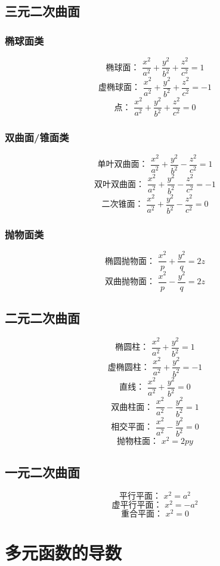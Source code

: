 \documentclass[12pt, a4paper, oneside]{ctexbook}
\begin{document}
  \subsection{三元二次曲面}
    \subsubsection{椭球面类}
    $$
    \text{椭球面： }\frac{x^2}{a^2}+\frac{y^2}{b^2}+\frac{z^2}{c^2}=1
    $$
    $$
    \text{虚椭球面： }\frac{x^2}{a^2}+\frac{y^2}{b^2}+\frac{z^2}{c^2}=-1
    $$
    $$
    \text{点： }\frac{x^2}{a^2}+\frac{y^2}{b^2}+\frac{z^2}{c^2}=0
    $$
    \subsubsection{双曲面/锥面类}
    $$
    \text{单叶双曲面： }\frac{x^2}{a^2}+\frac{y^2}{b^2}-\frac{z^2}{c^2}=1
    $$
    $$
    \text{双叶双曲面： }\frac{x^2}{a^2}+\frac{y^2}{b^2}-\frac{z^2}{c^2}=-1
    $$
    $$
    \text{二次锥面： }\frac{x^2}{a^2}+\frac{y^2}{b^2}-\frac{z^2}{c^2}=0
    $$
    \subsubsection{抛物面类}
    $$
    \text{椭圆抛物面： }\frac{x^2}{p}+\frac{y^2}{q}=2z
    $$
    $$
    \text{双曲抛物面： }\frac{x^2}{p}-\frac{y^2}{q}=2z
    $$
  \subsection{二元二次曲面}
    $$
    \text{椭圆柱： }\frac{x^2}{a^2}+\frac{y^2}{b^2}=1
    $$
    $$
    \text{虚椭圆柱： }\frac{x^2}{a^2}+\frac{y^2}{b^2}=-1
    $$
    $$
    \text{直线： }\frac{x^2}{a^2}+\frac{y^2}{b^2}=0
    $$
    $$
    \text{双曲柱面： }\frac{x^2}{a^2}-\frac{y^2}{b^2}=1
    $$
    $$
    \text{相交平面： }\frac{x^2}{a^2}-\frac{y^2}{b^2}=0
    $$
    $$
    \text{抛物柱面： }x^2=2py
    $$
  \subsection{一元二次曲面}
    $$
    \text{平行平面： }x^2=a^2
    $$
    $$
    \text{虚平行平面： }x^2=-a^2
    $$
    $$
    \text{重合平面： }x^2=0
    $$

\section{多元函数的导数}
\end{document}
